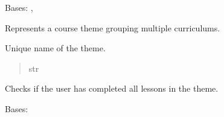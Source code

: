 \documentclass[letterpaper,10pt,english]{sphinxmanual}
\begin{document}

\begin{fulllineitems}
\label{\detokenize{courses:courses.models.Theme}}
\pysigstartsignatures
\pysiglinewithargsret
{}
{\sphinxparamcomma {}}
{}
\pysigstopsignatures
\sphinxAtStartPar
Bases: {\hyperref[\detokenize{core:core.models.AuditableMixin}]{}}, 

\sphinxAtStartPar
Represents a course theme grouping multiple curriculums.

\begin{fulllineitems}
\label{\detokenize{courses:courses.models.Theme.name}}
\pysigstartsignatures
\pysigline
{}
\pysigstopsignatures
\sphinxAtStartPar
Unique name of the theme.
\begin{quote}\begin{description}
\sphinxAtStartPar
str

\end{description}\end{quote}

\end{fulllineitems}


\begin{fulllineitems}
\label{\detokenize{courses:courses.models.Theme.is_certified_by_user}}
\pysigstartsignatures
\pysiglinewithargsret
{}
{}
{}
\pysigstopsignatures
\sphinxAtStartPar
Checks if the user has completed all lessons in the theme.

\end{fulllineitems}


\begin{fulllineitems}
\label{\detokenize{courses:courses.models.Theme.DoesNotExist}}
\pysigstartsignatures
\pysigline
{}
\pysigstopsignatures
\sphinxAtStartPar
Bases: 


\end{fulllineitems}
\end{fulllineitems}
\end{document}
